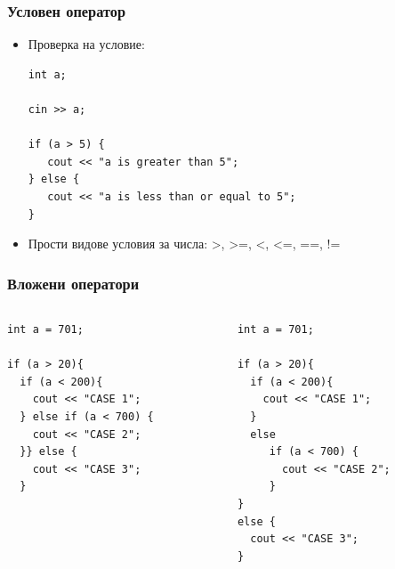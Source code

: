 \documentclass{beamer}
\begin{document}
\begin{frame}[fragile]
\frametitle{Условен оператор}
\begin{itemize}
\item Проверка на условие: 
\begin{lstlisting}
int a;

cin >> a;

if (a > 5) {
   cout << "a is greater than 5";
} else {
   cout << "a is less than or equal to 5";
}
\end{lstlisting}
\item Прости видове условия за числа: >, >=, <, <=, ==, !=
\end{itemize}

\end{frame} 

\begin{frame}[fragile]
\frametitle{Вложени оператори}



\begin{columns}
  \begin{column}{0.5\textwidth}
  \begin{lstlisting}
int a = 701;

if (a > 20){
  if (a < 200){
    cout << "CASE 1";
  } else if (a < 700) {
    cout << "CASE 2";
  }} else {
    cout << "CASE 3";
  }


\end{lstlisting}
  \end{column}

\pause

  \begin{column}{0.5\textwidth}
  \begin{lstlisting}
int a = 701;

if (a > 20){
  if (a < 200){
    cout << "CASE 1";
  } 
  else 
     if (a < 700) {
       cout << "CASE 2";
     }
} 
else {
  cout << "CASE 3";
}
\end{lstlisting}
  \end{column}
\end{columns}



\end{frame}
\end{document}
